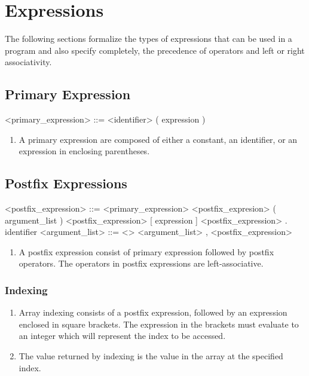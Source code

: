 \section{Expressions}
The following sections formalize the types of expressions that can be used in a \lepix{} program and also specify completely, the precedence of operators and left or right associativity.

\subsection{Primary Expression}
\begin{grammar}
	<primary_expression> ::= <identifier> 
	\alt <float-constant> 
	\alt ( expression )
\end{grammar}
\begin{enumerate}
	\item A primary expression are composed of either a constant, an identifier, or an expression in enclosing parentheses.
\end{enumerate}

\subsection{Postfix Expressions}
\begin{grammar}
	<postfix_expression> ::= <primary_expression> 
	\alt <postfix_expresion> ( argument_list )
	\alt <postfix_expression> [ expression ]
	\alt <postfix_expression> . identifier
	<argument_list> ::= <>
	\alt <argument_list> , <postfix_expression>
\end{grammar}
\begin{enumerate}
	\item A postfix expression consist of primary expression followed by postfix operators. The operators in postfix expressions are left-associative.
\end{enumerate}

\subsubsection{Indexing}
\begin{enumerate}
	\item Array indexing consists of a postfix expression, followed by an expression enclosed in square brackets. The expression in the brackets must evaluate to an integer which will represent the index to be accessed.
	\item The value returned by indexing is the value in the array at the specified index.
\end{enumerate}

